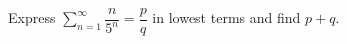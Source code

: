 Express $\displaystyle\sum_{n=1}^{\infty}\dfrac{n}{5^n}=\dfrac{p}{q}$ in lowest terms and find $p+q$.
